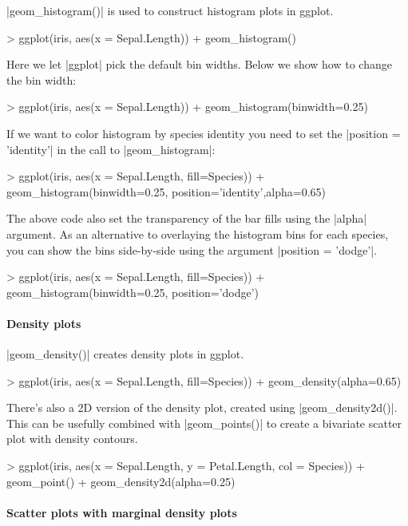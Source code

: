 |geom_histogram()| is used to construct histogram plots in ggplot.
%
\begin{R}
> ggplot(iris, aes(x = Sepal.Length)) + geom_histogram()
\end{R}
%
Here we let |ggplot| pick the default bin widths.  Below we show how to change the bin width:
%
\begin{R}
> ggplot(iris, aes(x = Sepal.Length)) + geom_histogram(binwidth=0.25)
\end{R}
If we want to color histogram by species identity you need to set the |position = 'identity'| in the call to |geom_histogram|:
\begin{R}
> ggplot(iris, aes(x = Sepal.Length, fill=Species)) + 
        geom_histogram(binwidth=0.25, position='identity',alpha=0.65)
\end{R}
The above code also set the transparency of the bar fills using the |alpha| argument.  As an alternative to overlaying the histogram bins for each species, you can show the bins side-by-side using the argument |position = 'dodge'|.
\begin{R}
> ggplot(iris, aes(x = Sepal.Length, fill=Species)) + 
        geom_histogram(binwidth=0.25, position='dodge')
\end{R}

\paragraph{Density plots}

|geom_density()| creates density plots in ggplot.
%
\begin{R}
> ggplot(iris, aes(x = Sepal.Length, fill=Species)) + 
        geom_density(alpha=0.65)
\end{R}

There's also a 2D version of the density plot, created using |geom_density2d()|.  This can be usefully combined with |geom_points()| to create a bivariate scatter plot with density contours.
%
\begin{R}
> ggplot(iris, aes(x = Sepal.Length, y = Petal.Length, col = Species)) + 
    geom_point() + geom_density2d(alpha=0.25)
\end{R}

\paragraph{Scatter plots with marginal density plots}

